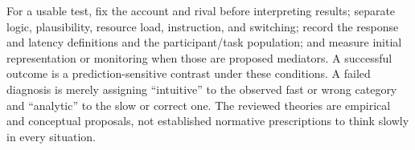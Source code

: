 For a usable test, fix the account and rival before interpreting results;
separate logic, plausibility, resource load, instruction, and switching;
record the response and latency definitions and the participant/task
population; and measure initial representation or monitoring when those
are proposed mediators. A successful outcome is a prediction-sensitive
contrast under these conditions. A failed diagnosis is merely assigning
``intuitive'' to the observed fast or wrong category and ``analytic''
to the slow or correct one. The reviewed theories are empirical and
conceptual proposals, not established normative prescriptions to think
slowly in every situation.
